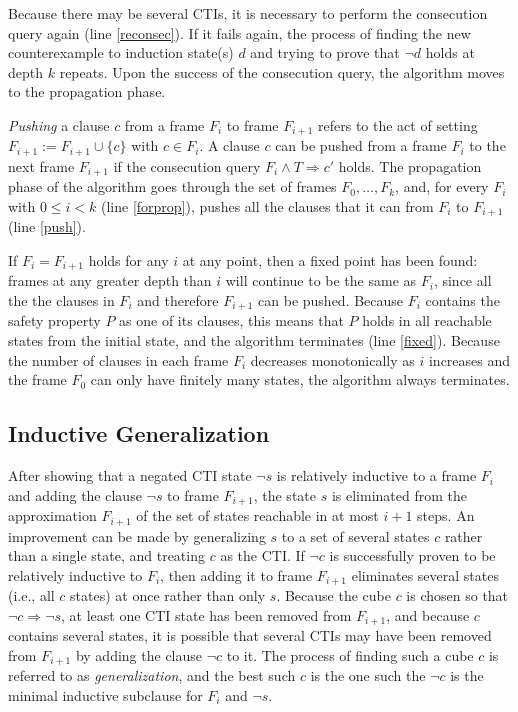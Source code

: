 \documentclass[12pt,a4paper,twoside,openright]{report}
\begin{document}
{Because there may be several CTIs, it is necessary to
perform the consecution query again (line \ref{reconsec}). If it fails again,
the process of finding the new counterexample to induction state(s) $d$ and trying to
prove that $\neg d$ holds at depth $k$ repeats. Upon the success of the consecution
query, the algorithm moves to the propagation phase.

\emph{Pushing} a clause $c$ from a frame $F_i$ to frame $F_{i + 1}$ refers to the act
of setting $F_{i + 1} := F_{i + 1} \cup \{ c \}$ with $c \in F_i$.
A clause $c$ can be pushed from a frame $F_i$ to the next frame $F_{i + 1}$
if the consecution query $F_i \wedge T \Rightarrow c'$ holds.
The propagation phase of the algorithm goes through the set of frames
$F_0, \ldots, F_k$, and, for every $F_i$ with $0 \leq i < k$ (line \ref{forprop}),
pushes all the clauses that it can from $F_i$ to $F_{i + 1}$ (line \ref{push}).

If $F_i = F_{i + 1}$ holds for any $i$ at any point, then a fixed point has
been found: frames at any greater depth than $i$ will continue to be the
same as $F_i$, since all the the clauses in $F_i$ and therefore $F_{i + 1}$
can be pushed.
Because $F_i$ contains the safety property $P$ as one of its clauses,
this means that $P$ holds in all reachable states from the initial state,
and the algorithm terminates (line \ref{fixed}). Because the number of
clauses in each frame $F_i$ decreases monotonically as $i$ increases and the
frame $F_0$ can only have finitely many states, the algorithm always
terminates.

\subsection{Inductive Generalization}

After showing that a negated CTI state $\neg s$ is relatively inductive to a
frame $F_i$ and adding the clause $\neg s$ to frame $F_{i + 1}$, the state
$s$ is eliminated from the approximation $F_{i + 1}$ of the set of states
reachable in at most $i + 1$ steps. An improvement can be made by generalizing
$s$ to a set of several states $c$ rather than a single state, and treating
$c$ as the CTI. If $\neg c$ is successfully proven to be relatively inductive
to $F_i$, then adding it to frame $F_{i + 1}$ eliminates several states (i.e.,
all $c$ states) at once rather than only $s$. Because the cube $c$
is chosen so that $\neg c \Rightarrow \neg s$, at least one CTI state
has been removed from $F_{i + 1}$, and because $c$ contains several states,
it is possible that several CTIs may have been removed from $F_{i + 1}$
by adding the clause $\neg c$ to it. The process of finding such a cube $c$
is referred to as \emph{generalization}, and the best such $c$ is the
one such the $\neg c$ is the minimal inductive subclause for $F_i$ and $\neg s$.

}
\end{document}
